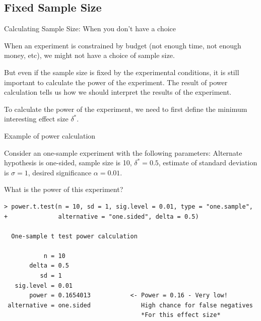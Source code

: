 \subsection{Fixed Sample Size}

\begin{frame}{Calculating Sample Size: When you don't have a choice}

When an experiment is constrained by budget (not enough time,
not enough money, etc), we might not have a choice of sample size.\bigskip

But even if the sample size is fixed by the experimental conditions, it is still
important to calculate the power of the experiment. The result of power
calculation tells us how we should interpret the results of the experiment.\bigskip

To calculate the power of the experiment, we need to first define the minimum
interesting effect size $\delta^*$.
\end{frame}

\begin{frame}[fragile]{Example of power calculation}

Consider an one-sample experiment with the following parameters: Alternate hypothesis is one-sided, sample size is 10, $\delta^*=0.5$, estimate of standard deviation is $\sigma=1$, desired significance $\alpha=0.01$.\medskip

What is the power of this experiment?

{\smaller
\begin{verbatim}
> power.t.test(n = 10, sd = 1, sig.level = 0.01, type = "one.sample",
+              alternative = "one.sided", delta = 0.5)

  One-sample t test power calculation

           n = 10
       delta = 0.5
          sd = 1
   sig.level = 0.01
       power = 0.1654013           <- Power = 0.16 - Very low!
 alternative = one.sided              High chance for false negatives
                                      *For this effect size*
\end{verbatim}}
\end{frame}

